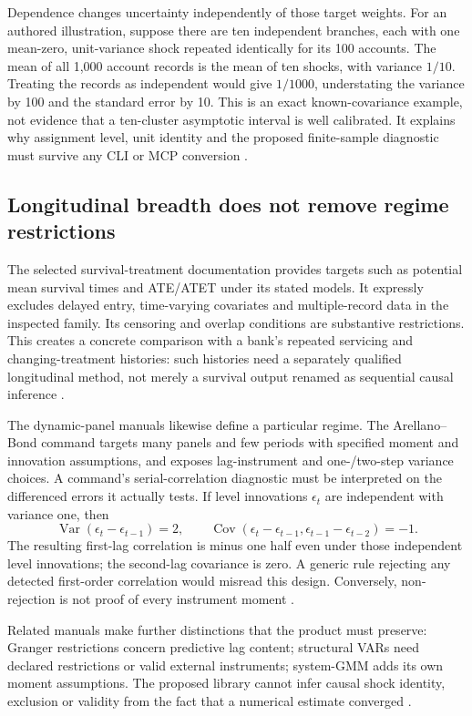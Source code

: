 Dependence changes uncertainty independently of those target weights.
For an authored illustration, suppose there are ten independent branches,
each with one mean-zero, unit-variance shock repeated identically for its
100 accounts. The mean of all 1,000 account records is the mean of ten
shocks, with variance $1/10$. Treating the records as independent would
give $1/1000$, understating the variance by 100 and the standard error by
10. This is an exact known-covariance example, not evidence that a
ten-cluster asymptotic interval is well calibrated. It explains why
assignment level, unit identity and the proposed finite-sample diagnostic
must survive any CLI or MCP conversion \citep{exec24_stata_choice}.

\subsection{Longitudinal breadth does not remove regime restrictions}
The selected survival-treatment documentation provides targets such as
potential mean survival times and ATE/ATET under its stated models. It
expressly excludes delayed entry, time-varying covariates and multiple-record
data in the inspected family. Its censoring and overlap conditions are
substantive restrictions. This creates a concrete comparison with a bank's
repeated servicing and changing-treatment histories: such histories need
a separately qualified longitudinal method, not merely a survival output
renamed as sequential causal inference
\citep{exec14_survival_stata,exec24_stata_choice}.

The dynamic-panel manuals likewise define a particular regime. The
Arellano--Bond command targets many panels and few periods with specified
moment and innovation assumptions, and exposes lag-instrument and
one-/two-step variance choices. A command's serial-correlation diagnostic
must be interpreted on the differenced errors it actually tests. If level
innovations $\epsilon_t$ are independent with variance one, then
\[
 \operatorname{Var}(\epsilon_t-\epsilon_{t-1})=2,\qquad
 \operatorname{Cov}(\epsilon_t-\epsilon_{t-1},
                    \epsilon_{t-1}-\epsilon_{t-2})=-1.
\]
The resulting first-lag correlation is minus one half even under those
independent level innovations; the second-lag covariance is zero. A generic
rule rejecting any detected first-order correlation would misread this
design. Conversely, non-rejection is not proof of every instrument moment
\citep{exec19_dynamic_stata_ab,exec24_stata_choice}.

Related manuals make further distinctions that the product must preserve:
Granger restrictions concern predictive lag content; structural VARs need
declared restrictions or valid external instruments; system-GMM adds its
own moment assumptions. The proposed library cannot infer causal shock
identity, exclusion or validity from the fact that a numerical estimate
converged \citep{exec13_ct_stata_granger,exec13_ct_stata_svar,
exec13_ct_stata_ivsvar,exec19_dynamic_stata_system,exec24_stata_choice}.

